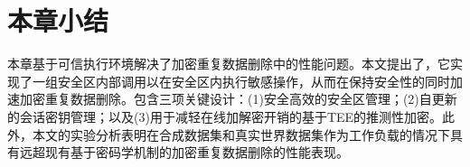 \section{本章小结}
\label{sec:sgxdedup-sgxdedup-conclusion}

本章基于可信执行环境解决了加密重复数据删除中的性能问题。本文提出了\sysnameS，它实现了一组安全区内部调用以在安全区内执行敏感操作，从而在保持安全性的同时加速加密重复数据删除。\sysnameS 包含三项关键设计：(1)安全高效的安全区管理；(2)自更新的会话密钥管理；以及(3)用于减轻在线加解密开销的基于TEE的推测性加密。此外，本文的实验分析表明\sysnameS 在合成数据集和真实世界数据集作为工作负载的情况下具有远超现有基于密码学机制的加密重复数据删除的性能表现。
